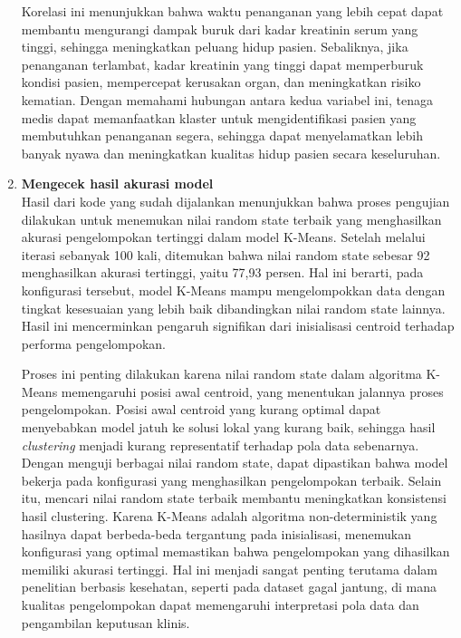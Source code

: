 \documentclass[english,12pt,a4paper,openany]{book}
\begin{document}
\begin{enumerate}
		Korelasi ini menunjukkan bahwa waktu penanganan yang lebih cepat dapat membantu mengurangi dampak buruk dari kadar kreatinin serum yang tinggi, sehingga meningkatkan peluang hidup pasien. Sebaliknya, jika penanganan terlambat, kadar kreatinin yang tinggi dapat memperburuk kondisi pasien, mempercepat kerusakan organ, dan meningkatkan risiko kematian. Dengan memahami hubungan antara kedua variabel ini, tenaga medis dapat memanfaatkan klaster untuk mengidentifikasi pasien yang membutuhkan penanganan segera, sehingga dapat menyelamatkan lebih banyak nyawa dan meningkatkan kualitas hidup pasien secara keseluruhan.
		
		
		
		\item\textbf{Mengecek hasil akurasi model}\\
		
		
		Hasil dari kode yang sudah dijalankan   menunjukkan bahwa proses pengujian dilakukan untuk menemukan nilai random state terbaik yang menghasilkan akurasi pengelompokan tertinggi dalam model K-Means. Setelah melalui iterasi sebanyak 100 kali, ditemukan bahwa nilai random state sebesar 92 menghasilkan akurasi tertinggi, yaitu 77,93 persen. Hal ini berarti, pada konfigurasi tersebut, model K-Means mampu mengelompokkan data dengan tingkat kesesuaian yang lebih baik dibandingkan nilai random state lainnya. Hasil ini mencerminkan pengaruh signifikan dari inisialisasi centroid terhadap performa pengelompokan. 
		
		Proses ini penting dilakukan karena nilai random state dalam algoritma K-Means memengaruhi posisi awal centroid, yang menentukan jalannya proses pengelompokan. Posisi awal centroid yang kurang optimal dapat menyebabkan model jatuh ke solusi lokal yang kurang baik, sehingga hasil \textit{clustering} menjadi kurang representatif terhadap pola data sebenarnya. Dengan menguji berbagai nilai random state, dapat dipastikan bahwa model bekerja pada konfigurasi yang menghasilkan pengelompokan terbaik. Selain itu, mencari nilai random state terbaik membantu meningkatkan konsistensi hasil clustering. Karena K-Means adalah algoritma non-deterministik yang hasilnya dapat berbeda-beda tergantung pada inisialisasi, menemukan konfigurasi yang optimal memastikan bahwa pengelompokan yang dihasilkan memiliki akurasi tertinggi. Hal ini menjadi sangat penting terutama dalam penelitian berbasis kesehatan, seperti pada dataset gagal jantung, di mana kualitas pengelompokan dapat memengaruhi interpretasi pola data dan pengambilan keputusan klinis.
		
		
		
	\end{enumerate}
	
\end{document}
